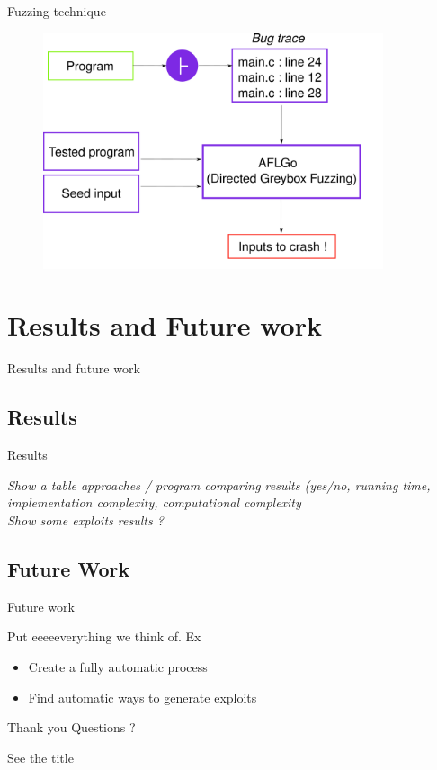 \documentclass{beamer}
\begin{document}
\begin{frame}{Fuzzing technique}

\begin{figure}
\includegraphics[width=10cm]{Figures/Fuzzing.png}
\end{figure}

\end{frame}


\section{Results and Future work}

\begin{frame}
\centering

Results and future work
\end{frame}

\subsection{Results}

\begin{frame}{Results}

\textit{Show a table approaches / program comparing results (yes/no, running time, implementation complexity, computational complexity } \\
\textit{Show some exploits results ?}

\end{frame}

\subsection{Future Work}
\begin{frame}{Future work}

Put eeeeeverything we think of. Ex
\begin{itemize}
\item Create a fully automatic process
\item Find automatic ways to generate exploits
\end{itemize}

\end{frame}


\begin{frame}{Thank you Questions ?}

See the title

\end{frame}
\end{document}
